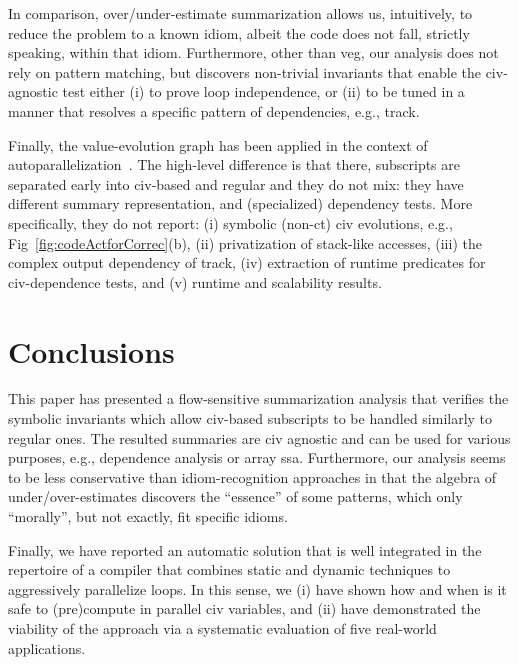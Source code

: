 \documentclass{sig-alternate}
\begin{document}
In comparison, over/under-estimate summarization allows us,
intuitively, to reduce the problem to a known idiom, albeit
the code does not fall, strictly speaking, within that idiom.
Furthermore, other than {\sc veg}, our analysis does not rely
on pattern matching, but discovers non-trivial invariants that
enable the {\sc civ}-agnostic test either (i) to prove loop independence,
or (ii) to be tuned in a manner that resolves a specific pattern 
of dependencies, e.g., {\sc track}.

Finally, the value-evolution graph has been applied in the context of 
autoparallelization~\cite{VEG}.   The high-level difference is that there, 
subscripts are separated early into {\sc civ}-based and regular and they 
do not mix: they have different summary representation, and (specialized) 
dependency tests.   
More specifically, they do not report:
(i)   symbolic (non-{\sc ct}) {\sc civ} evolutions,
        e.g., Fig~\ref{fig:codeActforCorrec}(b),
(ii)  privatization of stack-like accesses,
(iii) the complex output dependency of {\sc track},
(iv)  extraction of runtime predicates for {\sc civ}-dependence tests, and
(v)   runtime and scalability results.


\section{Conclusions}
\label{sec:Concl}

This paper has presented a flow-sensitive summarization analysis that 
verifies the symbolic invariants which allow {\sc civ}-based
subscripts to be handled similarly to regular ones. 
%
The resulted summaries are {\sc civ} agnostic and can be used for 
various  purposes, e.g., dependence analysis or array {\sc ssa}. 
%
Furthermore, our analysis seems to be less conservative than 
idiom-recognition approaches in that the algebra of under/over-estimates
discovers the ``essence'' of some patterns,
which only ``morally'', but not exactly, fit specific idioms.

Finally, we have reported an automatic solution that is well integrated 
in the repertoire of a compiler that combines static and dynamic techniques
to aggressively parallelize loops.   In this sense, we (i) have shown
how and when is it safe to (pre)compute in parallel {\sc civ} variables, and
(ii) have demonstrated the viability of the approach via a systematic
evaluation of five real-world applications.
\end{document}
